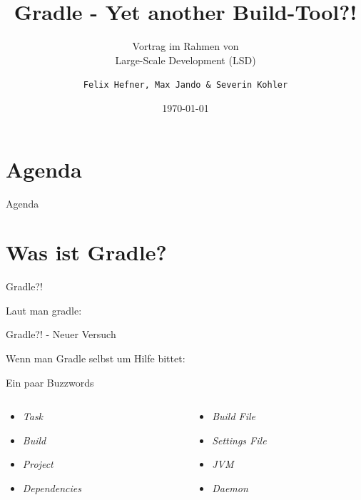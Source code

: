 \documentclass[newPxFont,numfooter,sectionpages]{beamer}
\title{Gradle - Yet another Build-Tool?!}
\subtitle{Vortrag im Rahmen von \\ Large-Scale Development (LSD)}
\date{\today{}}
\author{\texttt{Felix Hefner, Max Jando \& Severin Kohler}}
\institute{Hochschule Mannheim, WS 2017/18}
\begin{document}
%
%

\maketitle


%
%

\section*{Agenda}

\begin{frame}{Agenda}
\tableofcontents[hideallsubsections]
\end{frame}

\section{Was ist Gradle?}

\begin{frame}{Gradle?!}

Laut \alert{man gradle}:



\end{frame}

\begin{frame}{Gradle?! - Neuer Versuch}

Wenn man Gradle selbst um Hilfe bittet:



\end{frame}

\begin{frame}{Ein paar Buzzwords}
\begin{columns}
	\begin{column}{.48\linewidth}
		\begin{itemize}
			\item \emph{Task}
			\item \emph{Build}
			\item \emph{Project}
			\item \emph{Dependencies}
		\end{itemize}
	\end{column}
	\begin{column}{.48\linewidth}
		\begin{itemize}
			\item \emph{Build File}
			\item \emph{Settings File}
			\item \emph{JVM}
			\item \emph{Daemon}
		\end{itemize}
	\end{column}
\end{columns}
\end{frame}
\end{document}
